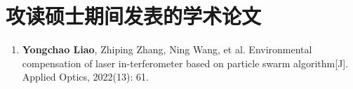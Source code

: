 





\chapter*{攻读硕士期间发表的学术论文}
\begin{enumerate}
  \renewcommand{\labelenumi}{[\theenumi].}
  \item \textbf{Yongchao Liao}, Zhiping Zhang, Ning Wang, et al. Environmental compensation of laser in-terferometer based on particle swarm algorithm[J].  Applied Optics, 2022(13): 61.
  \end{enumerate}


